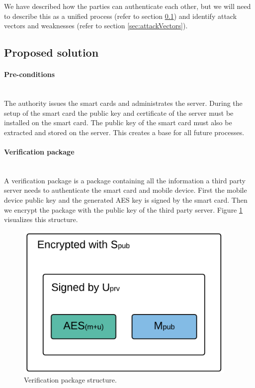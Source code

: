 We have described how the parties can authenticate each other, but we will need to describe this as a unified process (refer to section \ref{sec:proposedSolution}) and identify attack vectors and weaknesses (refer to section \ref{sec:attackVectors}).

\subsection{Proposed solution}
\label{sec:proposedSolution}

\paragraph{Pre-conditions}\mbox{}\\
The authority issues the smart cards and administrates the server. During the setup of the smart card the public key and certificate of the server must be installed on the smart card. The public key of the smart card must also be extracted and stored on the server. This creates a base for all future processes.

\paragraph{Verification package}\mbox{}\\
A verification package is a package containing all the information a third party server needs to authenticate the smart card and mobile device. First the mobile device public key and the generated AES key is signed by the smart card. Then we encrypt the package with the public key of the third party server. Figure \ref{fig:h0} visualizes this structure.

\newpage

\begin{figure}[h!]
  \caption{Verification package structure.}
  \label{fig:h0}
  \centering
    \includegraphics[width=0.95\textwidth]{images/H0.png}
\end{figure}

